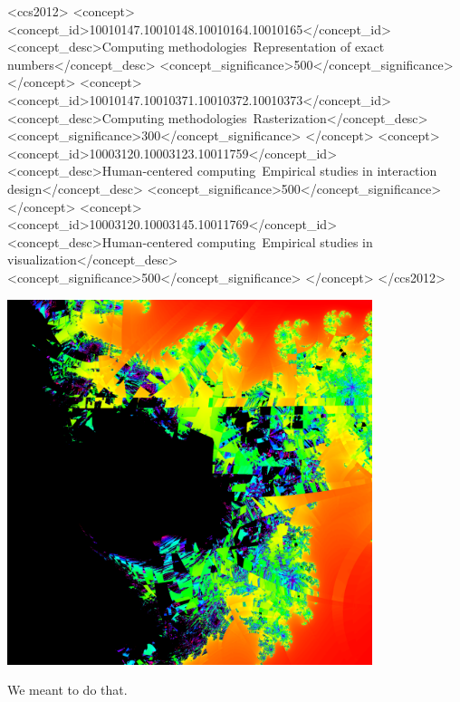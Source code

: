 \documentclass[sigconf,authorversion,nonacm]{acmart}
\begin{document}
\begin{CCSXML}
<ccs2012>
   <concept>
       <concept_id>10010147.10010148.10010164.10010165</concept_id>
       <concept_desc>Computing methodologies~Representation of exact numbers</concept_desc>
       <concept_significance>500</concept_significance>
       </concept>
   <concept>
       <concept_id>10010147.10010371.10010372.10010373</concept_id>
       <concept_desc>Computing methodologies~Rasterization</concept_desc>
       <concept_significance>300</concept_significance>
       </concept>
   <concept>
       <concept_id>10003120.10003123.10011759</concept_id>
       <concept_desc>Human-centered computing~Empirical studies in interaction design</concept_desc>
       <concept_significance>500</concept_significance>
       </concept>
   <concept>
       <concept_id>10003120.10003145.10011769</concept_id>
       <concept_desc>Human-centered computing~Empirical studies in visualization</concept_desc>
       <concept_significance>500</concept_significance>
       </concept>
 </ccs2012>
\end{CCSXML}




  \begin{teaserfigure}
    \centering
    \includegraphics[width=0.8\textwidth]{images/teaser.png}
    \caption{We meant to do that.}
  \end{teaserfigure}
\end{document}
